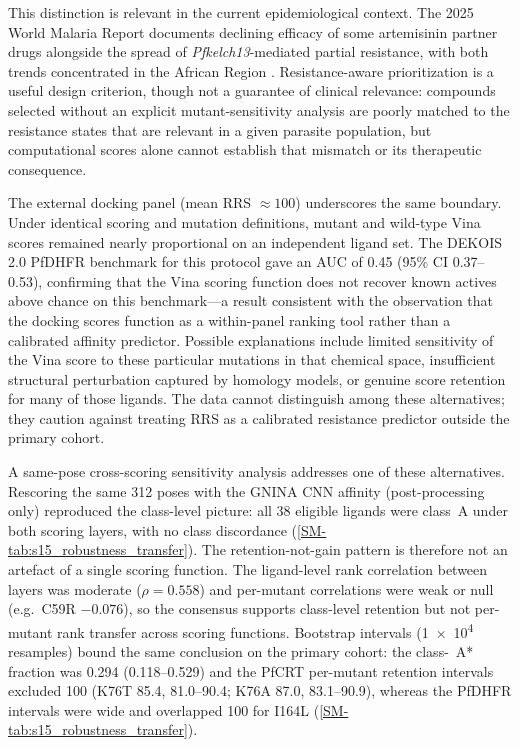 \documentclass[journal=jcisd8,manuscript=article,layout=traditional]{achemso}
\begin{document}
This distinction is relevant in the current epidemiological context. The 2025 World Malaria Report documents declining efficacy of some artemisinin partner drugs alongside the spread of \textit{Pfkelch13}-mediated partial resistance, with both trends concentrated in the African Region \citep{who_malaria_2025}. Resistance-aware prioritization is a useful design criterion, though not a guarantee of clinical relevance: compounds selected without an explicit mutant-sensitivity analysis are poorly matched to the resistance states that are relevant in a given parasite population, but computational scores alone cannot establish that mismatch or its therapeutic consequence.

The external docking panel (mean RRS $\approx\num{100}$) underscores the same boundary. Under identical scoring and mutation definitions, mutant and wild-type Vina scores remained nearly proportional on an independent ligand set. The DEKOIS 2.0 PfDHFR benchmark for this protocol gave an AUC of \num{0.45} (95\% CI \numrange{0.37}{0.53}), confirming that the Vina scoring function does not recover known actives above chance on this benchmark---a result consistent with the observation that the docking scores function as a within-panel ranking tool rather than a calibrated affinity predictor. Possible explanations include limited sensitivity of the Vina score to these particular mutations in that chemical space, insufficient structural perturbation captured by homology models, or genuine score retention for many of those ligands. The data cannot distinguish among these alternatives; they caution against treating RRS as a calibrated resistance predictor outside the primary cohort.

A same-pose cross-scoring sensitivity analysis addresses one of these alternatives. Rescoring the same \num{312} poses with the GNINA CNN affinity (post-processing only) reproduced the class-level picture: all \num{38} eligible ligands were class~A under both scoring layers, with no class discordance (\cref{SM-tab:s15_robustness_transfer}). The retention-not-gain pattern is therefore not an artefact of a single scoring function. The ligand-level rank correlation between layers was moderate ($\rho=\num{0.558}$) and per-mutant correlations were weak or null (e.g.\ C59R $-0.076$), so the consensus supports class-level retention but not per-mutant rank transfer across scoring functions. Bootstrap intervals (\num{1e4} resamples) bound the same conclusion on the primary cohort: the class-~A* fraction was \num{0.294} (\numrange{0.118}{0.529}) and the PfCRT per-mutant retention intervals excluded \num{100} (K76T \num{85.4}, \numrange{81.0}{90.4}; K76A \num{87.0}, \numrange{83.1}{90.9}), whereas the PfDHFR intervals were wide and overlapped \num{100} for I164L (\cref{SM-tab:s15_robustness_transfer}).
\end{document}
